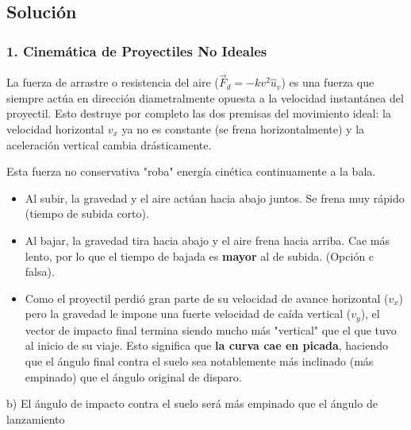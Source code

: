\documentclass[12pt, a4paper]{article}
\begin{document}
\subsection*{Solución}

\subsubsection*{1. Cinemática de Proyectiles No Ideales}
La fuerza de arrastre o resistencia del aire ($\vec{F}_d = -kv^2 \hat{u}_v$) es una fuerza que siempre actúa en dirección diametralmente opuesta a la velocidad instantánea del proyectil. Esto destruye por completo las dos premisas del movimiento ideal: la velocidad horizontal $v_x$ ya no es constante (se frena horizontalmente) y la aceleración vertical cambia drásticamente.

Esta fuerza no conservativa "roba" energía cinética continuamente a la bala. 
\begin{itemize}
    \item Al subir, la gravedad y el aire actúan hacia abajo juntos. Se frena muy rápido (tiempo de subida corto).
    \item Al bajar, la gravedad tira hacia abajo y el aire frena hacia arriba. Cae más lento, por lo que el tiempo de bajada es \textbf{mayor} al de subida. (Opción c falsa).
    \item Como el proyectil perdió gran parte de su velocidad de avance horizontal ($v_x$) pero la gravedad le impone una fuerte velocidad de caída vertical ($v_y$), el vector de impacto final termina siendo mucho más "vertical" que el que tuvo al inicio de su viaje. Esto significa que \textbf{la curva cae en picada}, haciendo que el ángulo final contra el suelo sea notablemente más inclinado (más empinado) que el ángulo original de disparo.
\end{itemize}

\begin{tcolorbox}[colback=green!5!white, colframe=green!50!black, title=Respuesta Final]
\centering \Large b) El ángulo de impacto contra el suelo será más empinado que el ángulo de lanzamiento
\end{tcolorbox}
\end{document}
